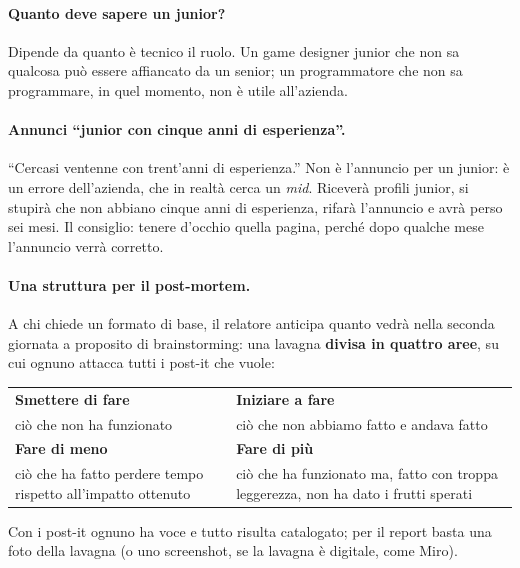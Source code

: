 \paragraph{Quanto deve sapere un junior?} Dipende da quanto è tecnico il
ruolo. Un game designer junior che non sa qualcosa può essere affiancato da un
senior; un programmatore che non sa programmare, in quel momento, non è utile
all'azienda.

\paragraph{Annunci ``junior con cinque anni di esperienza''.} ``Cercasi
ventenne con trent'anni di esperienza.'' Non è l'annuncio per un junior: è un
errore dell'azienda, che in realtà cerca un \emph{mid}. Riceverà profili
junior, si stupirà che non abbiano cinque anni di esperienza, rifarà l'annuncio
e avrà perso sei mesi. Il consiglio: tenere d'occhio quella pagina, perché
dopo qualche mese l'annuncio verrà corretto.

\paragraph{Una struttura per il post-mortem.} A chi chiede un formato di base,
il relatore anticipa quanto vedrà nella seconda giornata a proposito di
brainstorming: una lavagna \textbf{divisa in quattro aree}, su cui ognuno
attacca tutti i post-it che vuole:
\begin{center}
  \begin{tabular}{@{}p{}p{}@{}}
    \toprule
    \textbf{Smettere di fare} & \textbf{Iniziare a fare} \\
    ciò che non ha funzionato & ciò che non abbiamo fatto e andava fatto \\
    \midrule
    \textbf{Fare di meno} & \textbf{Fare di più} \\
    ciò che ha fatto perdere tempo rispetto all'impatto ottenuto &
    ciò che ha funzionato ma, fatto con troppa leggerezza, non ha dato i
    frutti sperati \\
    \bottomrule
  \end{tabular}
\end{center}
Con i post-it ognuno ha voce e tutto risulta catalogato; per il report basta
una foto della lavagna (o uno screenshot, se la lavagna è digitale, come Miro).

